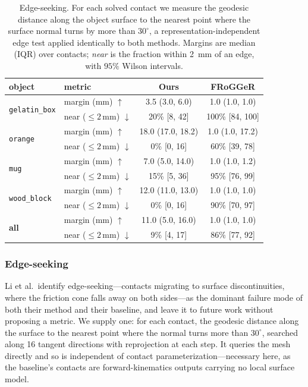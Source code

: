 \begin{table}[t]
\centering
\caption{Edge-seeking. For each solved contact we measure the geodesic distance along
the object surface to the nearest point where the surface normal turns by more than
$30^\circ$, a representation-independent edge test applied identically to both
methods. Margins are median (IQR) over contacts; \emph{near} is the fraction within
\SI{2}{\milli\meter} of an edge, with $95\%$ Wilson intervals.}
\label{tab:edge}
\small
\setlength{\tabcolsep}{3pt}
\begin{tabular}{@{}llcc@{}}
\toprule
object & metric & \textbf{Ours} & FRoGGeR \\
\midrule
\multirow{2}{*}{\texttt{gelatin\_box}} & margin (mm) $\uparrow$ & 3.5 (3.0, 6.0) & 1.0 (1.0, 1.0) \\
 & near ($\leq\!2$\,mm) $\downarrow$ & 20\% [8, 42] & 100\% [84, 100] \\
\midrule
\multirow{2}{*}{\texttt{orange}} & margin (mm) $\uparrow$ & 18.0 (17.0, 18.2) & 1.0 (1.0, 17.2) \\
 & near ($\leq\!2$\,mm) $\downarrow$ & 0\% [0, 16] & 60\% [39, 78] \\
\midrule
\multirow{2}{*}{\texttt{mug}} & margin (mm) $\uparrow$ & 7.0 (5.0, 14.0) & 1.0 (1.0, 1.2) \\
 & near ($\leq\!2$\,mm) $\downarrow$ & 15\% [5, 36] & 95\% [76, 99] \\
\midrule
\multirow{2}{*}{\texttt{wood\_block}} & margin (mm) $\uparrow$ & 12.0 (11.0, 13.0) & 1.0 (1.0, 1.0) \\
 & near ($\leq\!2$\,mm) $\downarrow$ & 0\% [0, 16] & 90\% [70, 97] \\
\midrule
\multirow{2}{*}{\textbf{all}} & margin (mm) $\uparrow$ & 11.0 (5.0, 16.0) & 1.0 (1.0, 1.0) \\
 & near ($\leq\!2$\,mm) $\downarrow$ & 9\% [4, 17] & 86\% [77, 92] \\
\bottomrule
\end{tabular}
\end{table}

\subsubsection{Edge-seeking}

Li et al.\ identify edge-seeking---contacts migrating to surface discontinuities,
where the friction cone falls away on both sides---as the dominant failure mode of
both their method and their baseline, and leave it to future work without proposing a
metric. We supply one: for each contact, the geodesic distance along the surface to
the nearest point where the normal turns more than $30^\circ$, searched along 16
tangent directions with reprojection at each step. It queries the mesh directly and so
is independent of contact parameterization---necessary here, as the baseline's
contacts are forward-kinematics outputs carrying no local surface model.

